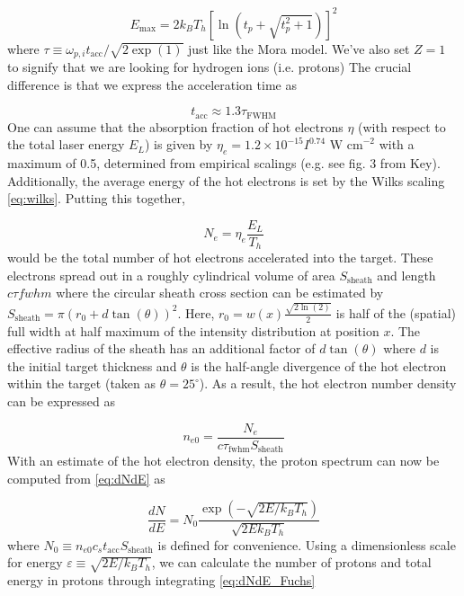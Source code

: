 \begin{equation}
	E_\text{max} = 2 k_B T_h [\ln(t_p + \sqrt{t_p^2 + 1})]^2 \label{eq:fuchs_maxE}
\end{equation}
where $\tau \equiv \omega_{p,i} t_\text{acc} / \sqrt{2 \exp(1)}$ just like the Mora model. We've also set $Z=1$ to signify that we are looking for hydrogen ions (i.e. protons) The crucial difference is that we express the acceleration time as 

\begin{equation}
	t_\text{acc} \approx 1.3 \tau_\text{FWHM} \label{eq:fuchs_multiplier}
\end{equation}
One can assume that the absorption fraction of hot electrons $\eta$ (with respect to the total laser energy $E_L$) is given by $\eta_e = 1.2 \times 10^{-15} I^{0.74} \text{ W cm}^{-2}$ with a maximum of 0.5, determined from empirical scalings (e.g. see fig. 3 from Key\cite{Key_1998_PoP}). Additionally, the average energy of the hot electrons is set by the Wilks scaling \cref{eq:wilks}. Putting this together, 

\begin{equation}
	N_e = \eta_e \frac{E_L}{T_h}
\end{equation}
would be the total number of hot electrons accelerated into the target. These electrons spread out in a roughly cylindrical volume of area $S_\text{sheath}$ and length $c \tau{fwhm}$ where the circular sheath cross section can be estimated by $S_\text{sheath} = \pi (r_0 + d \tan(\theta))^2$. Here, $r_0 = w(x) \frac{\sqrt{2 \ln(2)}}{2}$ is half of the (spatial) full width at half maximum of the intensity distribution at position $x$. The effective radius of the sheath has an additional factor of $d \tan(\theta)$ where $d$ is the initial target thickness and $\theta$ is the half-angle divergence of the hot electron within the target (taken as $\theta = 25^\circ$). As a result, the hot electron number density can be expressed as 
	
\begin{equation}
	n_{e0} = \frac{N_e}{c \tau_\text{fwhm} S_\text{sheath}}
\end{equation}
With an estimate of the hot electron density, the proton spectrum can now be computed from \cref{eq:dNdE} as 

\begin{equation}
	\frac{dN}{dE} = N_0 \frac{\exp(-\sqrt{2 E/k_B T_h})}{\sqrt{2 E k_B T_h}} \label{eq:dNdE_Fuchs}
\end{equation}
where $N_0 \equiv n_{e0} c_s t_\text{acc} S_\text{sheath}$ is defined for convenience. Using a dimensionless scale for energy $\varepsilon \equiv \sqrt{2 E / k_B T_h}$, we can calculate the number of protons and total energy in protons through integrating \cref{eq:dNdE_Fuchs}

